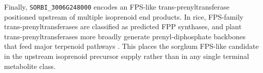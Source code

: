\documentclass[9pt,twocolumn,twoside]{rilabRxiv}
\begin{document}
Finally, \texttt{SORBI\_3006G248000} encodes an FPS-like trans-prenyltransferase positioned upstream of multiple isoprenoid end products. In rice, FPS-family trans-prenyltransferases are classified as predicted FPP synthases, and plant trans-prenyltransferases more broadly generate prenyl-diphosphate backbones that feed major terpenoid pathways \citep{Suratin2020RicePT}. This places the sorghum FPS-like candidate in the upstream isoprenoid precursor supply rather than in any single terminal metabolite class.




\end{document}
